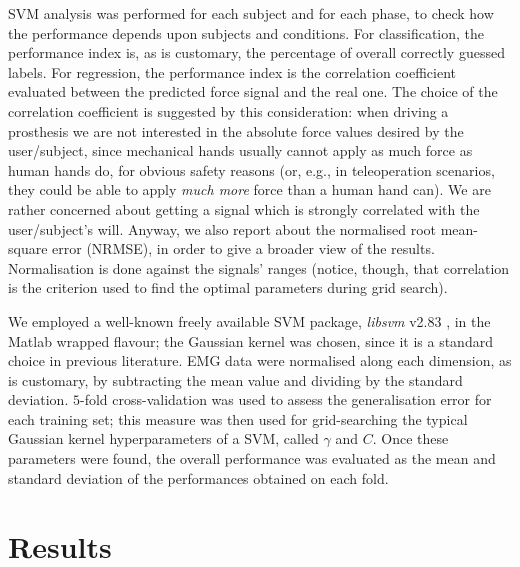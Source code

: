 \documentclass[10pt]{bmc_article}
\def\texttt{[image: ]}
\newenvironment{bmcformat}
  {\begin{raggedright}\baselineskip20pt\sloppy\setboolean{publ}{false}}
  {\end{raggedright}\baselineskip20pt\sloppy}
\begin{document}
\begin{bmcformat}
SVM analysis was performed for each subject and for each phase,
to check how the performance depends upon subjects and conditions.
For classification, the performance index is, as is
customary, the percentage of overall correctly guessed labels. For
regression, the performance index is the correlation coefficient
evaluated between the predicted force signal and the real one. The choice
of the correlation coefficient is suggested by this consideration:
when driving a prosthesis we are
not interested in the absolute force values desired by the
user/subject, since mechanical hands usually cannot apply as much
force as human hands do, for obvious safety reasons (or, e.g.,
in teleoperation scenarios, they could be able to apply \emph{much
more} force than a human hand can). We are rather concerned about
getting a signal which is strongly correlated with the user/subject's will.
Anyway, we also report about the normalised root mean-square error (NRMSE),
in order to give a broader view of the results. Normalisation is done against the
signals' ranges (notice, though, that correlation is the criterion used to
find the optimal parameters during grid search).

We employed a well-known freely available SVM package, \emph{libsvm}
v2.83 \cite{ChangL01}, in the Matlab wrapped flavour; the Gaussian kernel
was chosen, since it is a standard choice in previous literature.
EMG data were normalised along each dimension, as is customary, by subtracting
the mean value and dividing by the standard deviation. $5$-fold cross-validation was
used to assess the generalisation error for each training set; this measure
was then used for grid-searching the typical Gaussian kernel hyperparameters
of a SVM, called $\gamma$ and $C$. Once these parameters were found, the overall
performance was evaluated as the mean and standard deviation of the performances
obtained on each fold.



\section*{Results}
\label{sec:exp}


\end{bmcformat}
\end{document}
